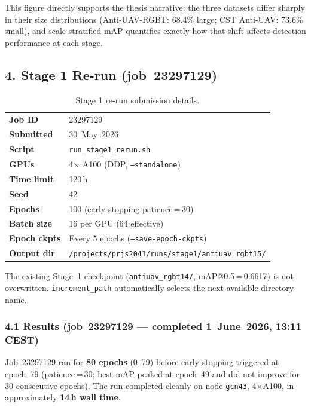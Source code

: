 \noindent This figure directly supports the thesis narrative: the three
datasets differ sharply in their size distributions
(Anti-UAV-RGBT: 68.4\% large; CST Anti-UAV: 73.6\% small),
and scale-stratified mAP quantifies exactly how that shift
affects detection performance at each stage.

\subsection*{4. Stage 1 Re-run (job~23297129)}

\begin{table}[h]
\centering
\caption{Stage 1 re-run submission details.}
\label{tab:s1_rerun}
\begin{tabular}{ll}
\hline
\textbf{Job ID}        & 23297129 \\
\textbf{Submitted}     & 30~May~2026 \\
\textbf{Script}        & \texttt{run\_stage1\_rerun.sh} \\
\textbf{GPUs}          & 4$\times$ A100 (DDP, \texttt{--standalone}) \\
\textbf{Time limit}    & 120\,h \\
\textbf{Seed}          & 42 \\
\textbf{Epochs}        & 100 (early stopping patience\,=\,30) \\
\textbf{Batch size}    & 16 per GPU (64 effective) \\
\textbf{Epoch ckpts}   & Every 5 epochs (\texttt{--save-epoch-ckpts}) \\
\textbf{Output dir}    & \texttt{/projects/prjs2041/runs/stage1/antiuav\_rgbt15/} \\
\hline
\end{tabular}
\end{table}

\noindent The existing Stage~1 checkpoint (\texttt{antiuav\_rgbt14/},
mAP@0.5\,=\,0.6617) is not overwritten. \texttt{increment\_path}
automatically selects the next available directory name.

\subsubsection*{4.1 Results (job~23297129 — completed 1~June~2026, 13:11 CEST)}

Job~23297129 ran for \textbf{80 epochs} (0--79) before early stopping
triggered at epoch~79 (patience\,=\,30; best mAP peaked at epoch~49
and did not improve for 30 consecutive epochs). The run completed
cleanly on node \texttt{gcn43}, 4$\times$A100, in approximately
\textbf{14\,h wall time}.

